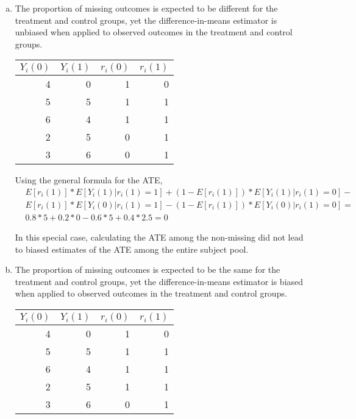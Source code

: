 \documentclass[11pt,notitlepage]{article}\usepackage[]{graphicx}\usepackage[]{color}
\begin{document}
\begin{enumerate}[a)]
\item The proportion of missing outcomes is expected to be different for the treatment and control groups, yet the difference-in-means estimator is unbiased when applied to observed outcomes in the treatment and control groups.

\begin{table}[htbp]
  \centering
    \begin{tabular}{rrrr}
    \toprule
    $Y_i(0)$ & $Y_i(1)$ & $r_i(0)$ & $r_i(1)$ \\
    \midrule
    4     & 0     & 1     & 0 \\
    5     & 5     & 1     & 1 \\
    6     & 4     & 1     & 1 \\
    2     & 5     & 0     & 1 \\
    3     & 6     & 0     & 1 \\
    \bottomrule
    \end{tabular}%
  \label{tab:addlabel}%
\end{table}%

Using the general formula for the ATE,
\begin{align*}
& E[r_i(1)] * E[Y_i(1)|r_i(1)=1] + (1-E[r_i(1)])*E[Y_i(1)|r_i(1)=0] - \\
& E[r_i(1)] * E[Y_i(0)|r_i(1)=1]-(1-E[r_i(1)])*E[Y_i(0)|r_i(1)=0] =\\
& 0.8 * 5 + 0.2 * 0 - 0.6*5 + 0.4*2.5 = 0
\end{align*}

In this special case, calculating the ATE among the non-missing did not lead to biased estimates of the ATE among the entire subject pool.

\item The proportion of missing outcomes is expected to be the same for the treatment and control groups, yet the difference-in-means estimator is biased when applied to observed outcomes in the treatment and control groups.

\begin{table}[H]
  \centering
    \begin{tabular}{rrrr}
    \toprule
    $Y_i(0)$ & $Y_i(1)$ & $r_i(0)$ & $r_i(1)$ \\
    \midrule
    4     & 0     & 1     & 0 \\
    5     & 5     & 1     & 1 \\
    6     & 4     & 1     & 1 \\
    2     & 5     & 1     & 1 \\
    3     & 6     & 0     & 1 \\
    \bottomrule
    \end{tabular}%
  \label{tab:addlabel}%
\end{table}%
\end{enumerate}
\end{document}
